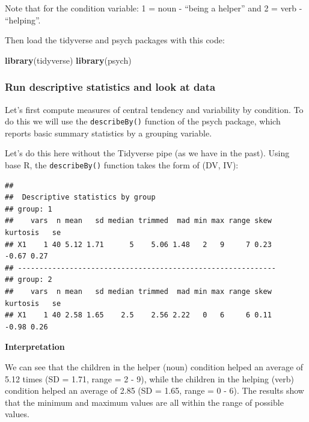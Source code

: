 \documentclass[
]{book}
\newenvironment{Shaded}{\begin{snugshade}}{\end{snugshade}}
\newcommand{\KeywordTok}[1]{\textcolor[rgb]{0.13,0.29,0.53}{\textbf{#1}}}
\newcommand{\NormalTok}[1]{#1}
\newcommand{\OperatorTok}[1]{\textcolor[rgb]{0.81,0.36,0.00}{\textbf{#1}}}
\begin{document}
Note that for the condition variable: 1 = noun - ``being a helper'' and 2 = verb - ``helping''.

Then load the tidyverse and psych packages with this code:

\begin{Shaded}
\begin{Highlighting}[]
\KeywordTok{library}\NormalTok{(tidyverse)}
\KeywordTok{library}\NormalTok{(psych)}
\end{Highlighting}
\end{Shaded}

\hypertarget{run-descriptive-statistics-and-look-at-data}{%
\subsubsection{Run descriptive statistics and look at data}\label{run-descriptive-statistics-and-look-at-data}}

Let's first compute measures of central tendency and variability by condition. To do this we will use the \texttt{describeBy()} function of the psych package, which reports basic summary statistics by a grouping variable.

Let's do this here without the Tidyverse pipe (as we have in the past). Using base R, the \texttt{describeBy()} function takes the form of (DV, IV):

\begin{Shaded}
\end{Shaded}

\begin{verbatim}
## 
##  Descriptive statistics by group 
## group: 1
##    vars  n mean   sd median trimmed  mad min max range skew kurtosis   se
## X1    1 40 5.12 1.71      5    5.06 1.48   2   9     7 0.23    -0.67 0.27
## ------------------------------------------------------------ 
## group: 2
##    vars  n mean   sd median trimmed  mad min max range skew kurtosis   se
## X1    1 40 2.58 1.65    2.5    2.56 2.22   0   6     6 0.11    -0.98 0.26
\end{verbatim}

\textbf{Interpretation}

We can see that the children in the helper (noun) condition helped an average of 5.12 times (SD = 1.71, range = 2 - 9), while the children in the helping (verb) condition helped an average of 2.85 (SD = 1.65, range = 0 - 6). The results show that the minimum and maximum values are all within the range of possible values.
\end{document}
